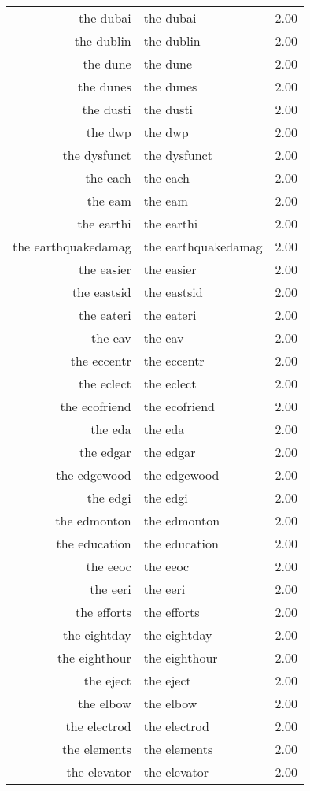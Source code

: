 \begin{table}[ht]
\begin{tabular}{rlr}
  the dubai & the dubai & 2.00 \\ 
  the dublin & the dublin & 2.00 \\ 
  the dune & the dune & 2.00 \\ 
  the dunes & the dunes & 2.00 \\ 
  the dusti & the dusti & 2.00 \\ 
  the dwp & the dwp & 2.00 \\ 
  the dysfunct & the dysfunct & 2.00 \\ 
  the each & the each & 2.00 \\ 
  the eam & the eam & 2.00 \\ 
  the earthi & the earthi & 2.00 \\ 
  the earthquakedamag & the earthquakedamag & 2.00 \\ 
  the easier & the easier & 2.00 \\ 
  the eastsid & the eastsid & 2.00 \\ 
  the eateri & the eateri & 2.00 \\ 
  the eav & the eav & 2.00 \\ 
  the eccentr & the eccentr & 2.00 \\ 
  the eclect & the eclect & 2.00 \\ 
  the ecofriend & the ecofriend & 2.00 \\ 
  the eda & the eda & 2.00 \\ 
  the edgar & the edgar & 2.00 \\ 
  the edgewood & the edgewood & 2.00 \\ 
  the edgi & the edgi & 2.00 \\ 
  the edmonton & the edmonton & 2.00 \\ 
  the education & the education & 2.00 \\ 
  the eeoc & the eeoc & 2.00 \\ 
  the eeri & the eeri & 2.00 \\ 
  the efforts & the efforts & 2.00 \\ 
  the eightday & the eightday & 2.00 \\ 
  the eighthour & the eighthour & 2.00 \\ 
  the eject & the eject & 2.00 \\ 
  the elbow & the elbow & 2.00 \\ 
  the electrod & the electrod & 2.00 \\ 
  the elements & the elements & 2.00 \\ 
  the elevator & the elevator & 2.00 \\ 

\end{tabular}
\end{table}
